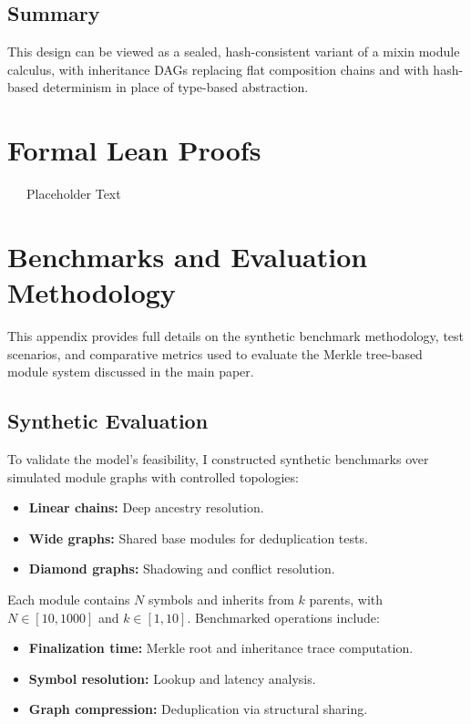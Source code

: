 \documentclass[sigplan,screen]{acmart}
\begin{document}
\subsection{Summary}

This design can be viewed as a sealed, hash-consistent variant of a mixin module calculus, with inheritance DAGs replacing flat composition chains and with hash-based determinism in place of type-based abstraction.

\section{Formal Lean Proofs}
\label{appendix:formal-proofs}
~~~Placeholder Text~~~

\section{Benchmarks and Evaluation Methodology}
\label{appendix:supplementary-evaluation}

This appendix provides full details on the synthetic benchmark methodology, test scenarios, and comparative metrics used to evaluate the Merkle tree-based module system discussed in the main paper.

\subsection{Synthetic Evaluation}

To validate the model's feasibility, I constructed synthetic benchmarks over simulated module graphs with controlled topologies:

\begin{itemize}
  \item \textbf{Linear chains:} Deep ancestry resolution.
  \item \textbf{Wide graphs:} Shared base modules for deduplication tests.
  \item \textbf{Diamond graphs:} Shadowing and conflict resolution.
\end{itemize}

Each module contains $N$ symbols and inherits from $k$ parents, with $N \in [10, 1000]$ and $k \in [1, 10]$. Benchmarked operations include:

\begin{itemize}
  \item \textbf{Finalization time:} Merkle root and inheritance trace computation.
  \item \textbf{Symbol resolution:} Lookup and latency analysis.
  \item \textbf{Graph compression:} Deduplication via structural sharing.
\end{itemize}
\end{document}
